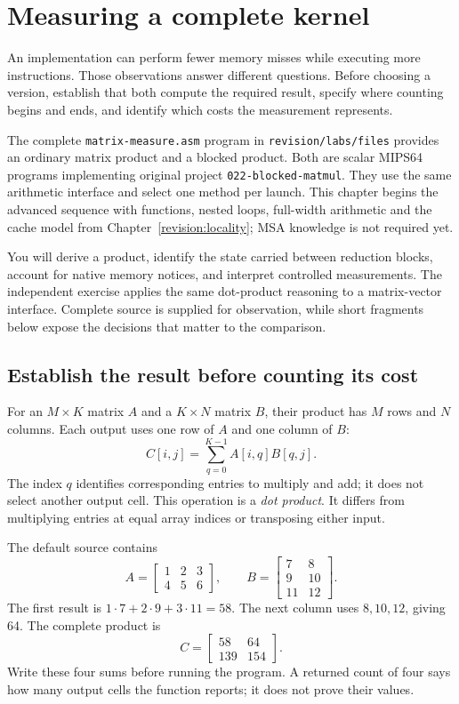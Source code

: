\chapter{Measuring a complete kernel}
\label{revision:measurement}

An implementation can perform fewer memory misses while executing more
instructions. Those observations answer different questions. Before choosing a
version, establish that both compute the required result, specify where counting
begins and ends, and identify which costs the measurement represents.

The complete \texttt{matrix-measure.asm} program in \texttt{revision/labs/files}
provides an ordinary matrix product and a blocked product. Both are scalar MIPS64
programs implementing original project \texttt{022-blocked-matmul}. They use the
same arithmetic interface and select one method per launch. This chapter begins
the advanced sequence with functions, nested loops, full-width arithmetic and the
cache model from Chapter~\ref{revision:locality}; MSA knowledge is not required yet.

You will derive a product, identify the state carried between reduction blocks,
account for native memory notices, and interpret controlled measurements. The
independent exercise applies the same dot-product reasoning to a matrix-vector
interface. Complete source is supplied for observation, while short fragments
below expose the decisions that matter to the comparison.

\section{Establish the result before counting its cost}

For an $M\times K$ matrix $A$ and a $K\times N$ matrix $B$, their product has
$M$ rows and $N$ columns. Each output uses one row of $A$ and one column of $B$:
\[
  C[i,j]=\sum_{q=0}^{K-1} A[i,q]B[q,j].
\]
The index $q$ identifies corresponding entries to multiply and add; it does not
select another output cell. This operation is a \emph{dot product}. It differs
from multiplying entries at equal array indices or transposing either input.

The default source contains
\[
  A=\begin{bmatrix}1&2&3\\4&5&6\end{bmatrix},\qquad
  B=\begin{bmatrix}7&8\\9&10\\11&12\end{bmatrix}.
\]
The first result is $1\cdot7+2\cdot9+3\cdot11=58$. The next column uses
$8,10,12$, giving 64. The complete product is
\[
  C=\begin{bmatrix}58&64\\139&154\end{bmatrix}.
\]
Write these four sums before running the program. A returned count of four says
how many output cells the function reports; it does not prove their values.

